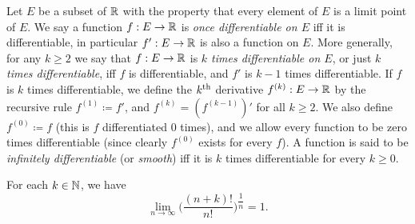 \begin{defn}\label{ii:4.2.4}
  Let \(E\) be a subset of \(\mathbb{R}\) with the property that every element of \(E\) is a limit point of \(E\).
  We say a function \(f : E \to \mathbb{R}\) is \emph{once differentiable on \(E\)} iff it is differentiable, in particular \(f': E \to \mathbb{R}\) is also a function on \(E\).
  More generally, for any \(k \geq 2\) we say that \(f : E \to \mathbb{R}\) is \emph{\(k\) times differentiable on \(E\)}, or just \emph{\(k\) times differentiable}, iff \(f\) is differentiable, and \(f'\) is \(k - 1\) times differentiable.
  If \(f\) is \(k\) times differentiable, we define the \(k^{\operatorname{th}}\) derivative \(f^{(k)} : E \to \mathbb{R}\) by the recursive rule \(f^{(1)} \coloneqq f'\), and \(f^{(k)} = (f^{(k - 1)})'\) for all \(k \geq 2\).
  We also define \(f^{(0)} \coloneqq f\) (this is \(f\) differentiated \(0\) times), and we allow every function to be zero times differentiable (since clearly \(f^{(0)}\) exists for every \(f\)).
  A function is said to be \emph{infinitely differentiable} (or \emph{smooth}) iff it is \(k\) times differentiable for every \(k \geq 0\).
\end{defn}

\begin{ac}\label{ii:ac:4.2.1}
  For each \(k \in \mathbb{N}\), we have
  \[
    \lim_{n \to \infty} \bigg(\dfrac{(n + k)!}{n!}\bigg)^{\dfrac{1}{n}} = 1.
  \]
\end{ac}

